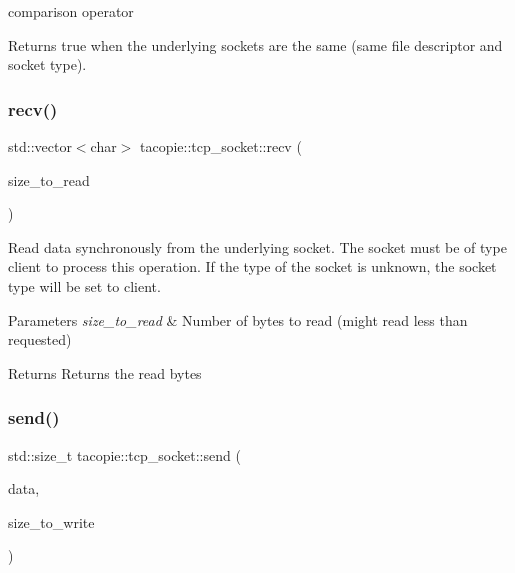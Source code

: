 comparison operator

\begin{DoxyReturn}{Returns}
true when the underlying sockets are the same (same file descriptor and socket type). 
\end{DoxyReturn}
\mbox{\label{classtacopie_1_1tcp__socket_a0d6d30258a902d12b3c2c62644756685}} 
\subsubsection{\texorpdfstring{recv()}{recv()}}
{\footnotesize\ttfamily std\+::vector$<$char$>$ tacopie\+::tcp\+\_\+socket\+::recv (\begin{DoxyParamCaption}\item[{std\+::size\+\_\+t}]{size\+\_\+to\+\_\+read }\end{DoxyParamCaption})}

Read data synchronously from the underlying socket. The socket must be of type client to process this operation. If the type of the socket is unknown, the socket type will be set to client.


\begin{DoxyParams}{Parameters}
{\em size\+\_\+to\+\_\+read} & Number of bytes to read (might read less than requested) \\
\hline
\end{DoxyParams}
\begin{DoxyReturn}{Returns}
Returns the read bytes 
\end{DoxyReturn}
\mbox{\label{classtacopie_1_1tcp__socket_a36521a8f502adc665ad0fb1c53583d04}} 
\subsubsection{\texorpdfstring{send()}{send()}}
{\footnotesize\ttfamily std\+::size\+\_\+t tacopie\+::tcp\+\_\+socket\+::send (\begin{DoxyParamCaption}\item[{const std\+::vector$<$ char $>$ \&}]{data,  }\item[{std\+::size\+\_\+t}]{size\+\_\+to\+\_\+write }\end{DoxyParamCaption})}

